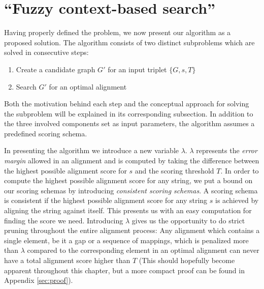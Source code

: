 \documentclass[thesis.tex]{subfiles}
\begin{document}
\section{``Fuzzy context-based search''}
Having properly defined the problem, we now present our algorithm as a proposed solution. The algorithm consists of two distinct subproblems which are solved in consecutive steps:
\begin{enumerate}
  \item Create a candidate graph $G'$ for an input triplet $\{G, s, T\}$
  \item Search $G'$ for an optimal alignment
\end{enumerate}
Both the motivation behind each step and the conceptual approach for solving the subproblem will be explained in its corresponding subsection. In addition to the three involved components set as input parameters, the algorithm assumes a predefined scoring schema.\\
\par\noindent
In presenting the algorithm we introduce a new variable $\lambda$. $\lambda$ represents the \textit{error margin} allowed in an alignment and is computed by taking the difference between the highest possible alignment score for $s$ and the scoring threshold $T$. In order to compute the highest possible alignment score for any string, we put a bound on our scoring schemas by introducing \textit{consistent scoring schemas}. A scoring schema is consistent if the highest possible alignment score for any string $s$ is achieved by aligning the string against itself. This presents us with an easy computation for finding the score we need. Introducing $\lambda$ gives us the opportunity to do strict pruning throughout the entire alignment process: Any alignment which contains a single element, be it a gap or a sequence of mappings, which is penalized more than $\lambda$ compared to the corresponding element in an optimal alignment can never have a total alignment score higher than $T$ (This should hopefully become apparent throughout this chapter, but a more compact proof can be found in Appendix \ref{sec:proof}).
\end{document}
